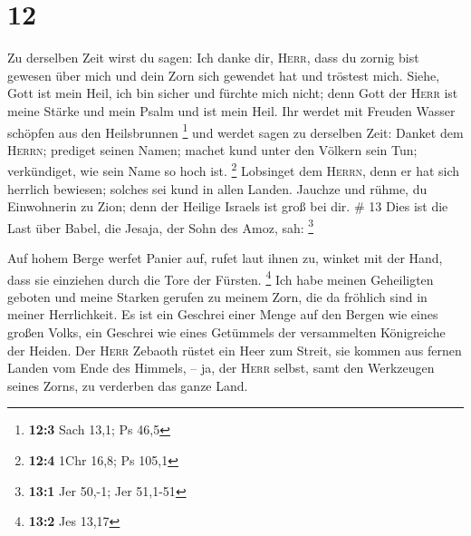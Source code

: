 \hypertarget{section-6}{%
\section{12}\label{section-6}}

 Zu derselben Zeit wirst du sagen: Ich danke dir,
\textsc{Herr}, dass du zornig bist gewesen über mich und dein Zorn sich
gewendet hat und tröstest mich.  Siehe, Gott ist mein
Heil, ich bin sicher und fürchte mich nicht; denn Gott der \textsc{Herr}
ist meine Stärke und mein Psalm und ist mein Heil.  Ihr
werdet mit Freuden Wasser schöpfen aus den Heilsbrunnen \footnote{\textbf{12:3}
  Sach 13,1; Ps 46,5}  und werdet sagen zu derselben Zeit:
Danket dem \textsc{Herrn}; prediget seinen Namen; machet kund unter den
Völkern sein Tun; verkündiget, wie sein Name so hoch ist. \footnote{\textbf{12:4}
  1Chr 16,8; Ps 105,1}  Lobsinget dem \textsc{Herrn}, denn
er hat sich herrlich bewiesen; solches sei kund in allen Landen.
 Jauchze und rühme, du Einwohnerin zu Zion; denn der
Heilige Israels ist groß bei dir. \# 13  Dies ist die Last
über Babel, die Jesaja, der Sohn des Amoz, sah: \footnote{\textbf{13:1}
  Jer 50,-1; Jer 51,1-51}

 Auf hohem Berge werfet Panier auf, rufet laut ihnen zu,
winket mit der Hand, dass sie einziehen durch die Tore der Fürsten.
\footnote{\textbf{13:2} Jes 13,17}  Ich habe meinen
Geheiligten geboten und meine Starken gerufen zu meinem Zorn, die da
fröhlich sind in meiner Herrlichkeit.  Es ist ein Geschrei
einer Menge auf den Bergen wie eines großen Volks, ein Geschrei wie
eines Getümmels der versammelten Königreiche der Heiden. Der
\textsc{Herr} Zebaoth rüstet ein Heer zum Streit,  sie
kommen aus fernen Landen vom Ende des Himmels, -- ja, der \textsc{Herr}
selbst, samt den Werkzeugen seines Zorns, zu verderben das ganze Land.

